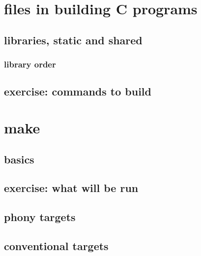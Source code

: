 
\section{files in building C programs}



\subsection{libraries, static and shared}



\subsubsection{library order}


\subsection{exercise: commands to build}



\section{make}

\subsection{basics}



\subsection{exercise: what will be run}



\subsection{phony targets}



\subsection{conventional targets}



